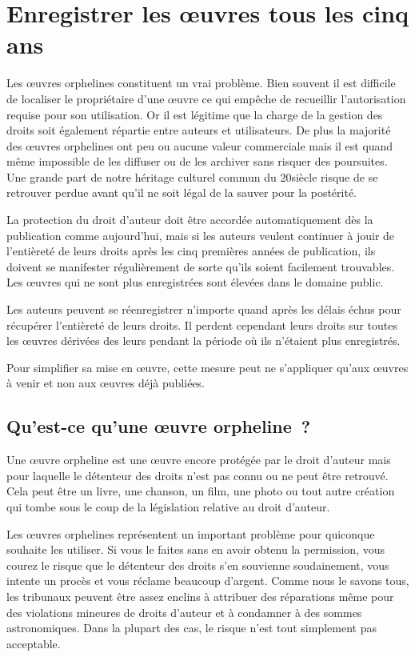 \chapter{Enregistrer les œuvres tous les cinq ans}\label{registre}

Les œuvres orphelines constituent un vrai problème. Bien souvent il est difficile de localiser le
propriétaire d’une œuvre ce qui empêche de recueillir l'autorisation requise pour son utilisation. Or il est légitime que la charge de la gestion des droits soit également répartie entre auteurs et utilisateurs. De plus la
majorité des œuvres orphelines ont peu ou aucune valeur commerciale mais il est quand même
impossible de les diffuser ou de les archiver sans risquer des poursuites. Une grande part de notre héritage culturel commun du 20\ieme siècle risque de
se retrouver perdue avant qu’il ne soit légal de la sauver pour la postérité.

\begin{mesure}
La protection du droit d’auteur doit être accordée automatiquement dès la publication comme
aujourd’hui, mais si les auteurs veulent continuer à jouir de l'entièreté de leurs droits après les cinq
premières années de publication, ils doivent se manifester régulièrement de sorte qu’ils soient facilement
trouvables. Les œuvres qui ne sont plus enregistrées sont élevées dans le domaine public.

Les auteurs peuvent se réenregistrer n'importe quand après les délais échus pour récupérer l'entièreté de leurs droits. Il perdent cependant leurs droits sur toutes les œuvres dérivées des leurs pendant la période où ils n'étaient plus enregistrés. 

Pour simplifier sa mise en œuvre, cette mesure peut ne s'appliquer qu'aux œuvres à venir et non aux œuvres déjà publiées.
\end{mesure}

\section{Qu'est-ce qu'une œuvre orpheline~?}

Une œuvre orpheline est une œuvre encore protégée par le droit d’auteur mais pour laquelle le
détenteur des droits n’est pas connu ou ne peut être retrouvé. Cela peut être un livre, une chanson,
un film, une photo ou tout autre création qui tombe sous le coup de la législation relative au droit
d’auteur.

Les œuvres orphelines représentent un important problème pour quiconque souhaite les utiliser. Si
vous le faites sans en avoir obtenu la permission, vous courez le risque que le détenteur des droits
s’en souvienne soudainement, vous intente un procès et vous réclame beaucoup d’argent. Comme nous le
savons tous, les tribunaux peuvent être assez enclins à attribuer des réparations même pour des
violations mineures de droits d’auteur et à condamner à des sommes astronomiques. Dans la plupart
des cas, le risque n’est tout simplement pas acceptable.

